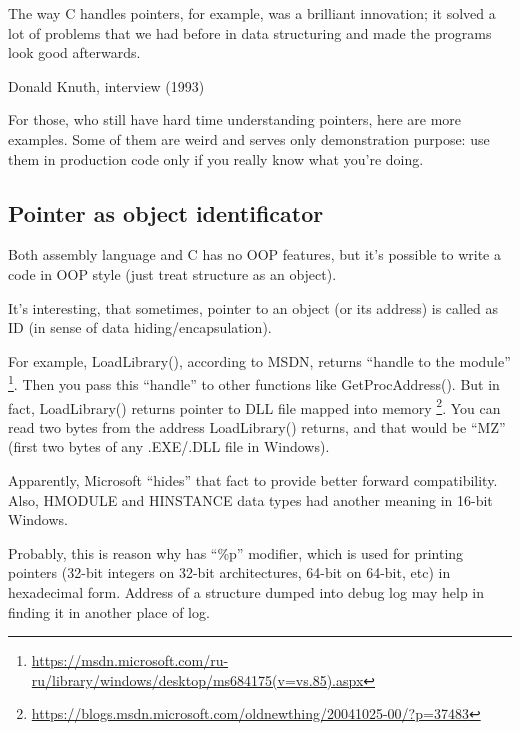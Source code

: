 \myindex{\CLanguageElements!\Pointers}
\label{label_pointers}

\epigraph{The way C handles pointers, for example, was a brilliant innovation;
it solved a lot of problems that we had before in data structuring and
made the programs look good afterwards.}{Donald Knuth, interview (1993)}

For those, who still have hard time understanding \CCpp pointers, here are more examples.
Some of them are weird and serves only demonstration purpose:
use them in production code only if you really know what you're doing.








\subsection{Pointer as object identificator}

Both assembly language and C has no \ac{OOP} features, but it's possible to write a code in \ac{OOP} style
(just treat structure as an object).

It's interesting, that sometimes, pointer to an object (or its address) is called as ID
(in sense of data hiding/encapsulation).

For example, LoadLibrary(), according to \ac{MSDN}, returns ``handle to the module''
\footnote{\url{https://msdn.microsoft.com/ru-ru/library/windows/desktop/ms684175(v=vs.85).aspx}}.
Then you pass this ``handle'' to other functions like GetProcAddress().
But in fact, LoadLibrary() returns pointer to DLL file mapped into memory
\footnote{\url{https://blogs.msdn.microsoft.com/oldnewthing/20041025-00/?p=37483}}.
You can read two bytes from the address LoadLibrary() returns, and that would be ``MZ'' (first two bytes of any
.EXE/.DLL file in Windows).

Apparently, Microsoft ``hides'' that fact to provide better forward compatibility.
Also, HMODULE and HINSTANCE data types had another meaning in 16-bit Windows.

Probably, this is reason why \printf has ``\%p'' modifier, which is used for printing pointers (32-bit integers
on 32-bit architectures, 64-bit on 64-bit, etc) in hexadecimal form.
Address of a structure dumped into debug log may help in finding it in another place of log.

